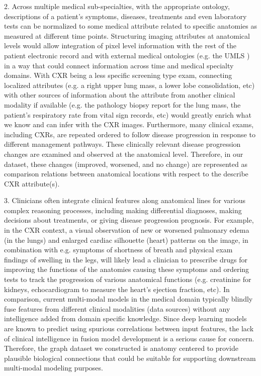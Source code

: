 2. Across multiple medical sub-specialties, with the appropriate ontology, descriptions of a patient's symptoms, diseases, treatments and even laboratory tests can be normalized to some medical attribute related to specific anatomies as measured at different time points. Structuring imaging attributes at anatomical levels would allow integration of pixel level information with the rest of the patient electronic record and with external medical ontologies (e.g. the UMLS \cite{}) in a way that could connect information across time and medical specialty domains. With CXR being a less specific screening type exam, connecting localized attributes (e.g. a right upper lung mass, a lower lobe consolidation, etc) with other sources of information about the attribute from another clinical modality if available (e.g. the pathology biopsy report for the lung mass, the patient's respiratory rate from vital sign records, etc) would greatly enrich what we know and can infer with the CXR images. Furthermore, many clinical exams, including CXRs, are repeated ordered to follow disease progression in response to different management pathways. These clinically relevant disease progression changes are examined and observed at the anatomical level. Therefore, in our dataset, these changes (improved, worsened, and no change) are represented as comparison relations between anatomical locations with respect to the describe CXR attribute(s).

3. Clinicians often integrate clinical features along anatomical lines for various complex reasoning processes, including making differential diagnoses, making decisions about treatments, or giving disease progression prognosis. For example, in the CXR context, a visual observation of new or worsened pulmonary edema (in the lungs) and enlarged cardiac silhouette (heart) patterns on the image, in combination with e.g. symptoms of shortness of breath and physical exam findings of swelling in the legs, will likely lead a clinician to prescribe drugs for improving the functions of the anatomies causing these symptoms and ordering tests to track the progression of various anatomical functions (e.g. creatinine for kidneys, echocardiogram to measure the heart's ejection fraction, etc). In comparison, current multi-modal models in the medical domain typically blindly fuse features from different clinical modalities (data sources) without any intelligence added from domain specific knowledge. Since deep learning models are known to predict using spurious correlations between input features, the lack of clinical intelligence in fusion model development is a serious cause for concern. Therefore, the graph dataset we constructed is anatomy centered to provide plausible biological connections that could be suitable for supporting downstream multi-modal modeling purposes.

